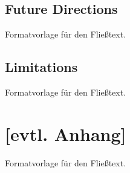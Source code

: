 \documentclass[a4paper,12pt,twoside]{scrreprt}
\begin{document}
\section{Future Directions}
Formatvorlage für den Fließtext.

\section{Limitations}
Formatvorlage für den Fließtext.

\clearpage
{}
{}
\printbibliography

\chapter*{[evtl. Anhang]}  %
Formatvorlage für den Fließtext.
\end{document}
